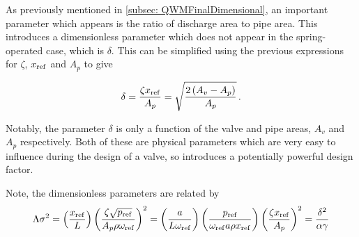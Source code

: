As previously mentioned in \cref{subsec: QWMFinalDimensional}, an important parameter which appears is the ratio of discharge area to pipe area. This introduces a dimensionless parameter which does not appear in the spring-operated case, which is $\delta$. This can be simplified using the previous expressions for $\zeta$, $x_{\rm{ref}}$ and $A_p$ to give

\begin{equation*}
    \delta = \frac{\zeta x_{\rm{ref}}}{A_p} = \sqrt{\frac{2 \left( A_v - A_p \right)}{A_p}} \, .
\end{equation*}

Notably, the parameter $\delta$ is only a function of the valve and pipe areas, $A_v$ and $A_p$ respectively. Both of these are physical parameters which are very easy to influence during the design of a valve, so introduces a potentially powerful design factor.

Note, the dimensionless parameters are related by
~
\begin{equation*}
    \Lambda \sigma^2 = \left( \frac{x_{\rm{ref}}}{L} \right) \left( \frac{\zeta \sqrt{p_{\rm{ref}}}}{A_p \rho \omega_{\rm{ref}}} \right)^2 = \left( \frac{a}{L \omega_{\rm{ref}}} \right) \left( \frac{p_{\rm{ref}}}{\omega_{\rm{ref}} a \rho x_{\rm{ref}}} \right) \left( \frac{\zeta x_{\rm{ref}}}{A_p} \right)^2 = \frac{\delta^2}{\alpha \gamma}
\end{equation*}

% 


